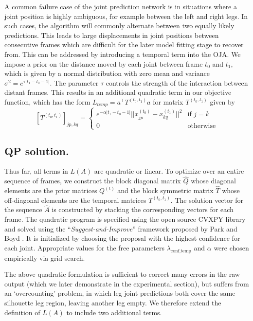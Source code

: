 A common failure case of the joint prediction network is in situations where a joint position is highly ambiguous, for example between the left and right legs. In such cases, the algorithm will commonly alternate between two equally likely predictions. This leads to large displacements in joint positions between consecutive frames which are difficult for the later model fitting stage to recover from. This can be addressed by introducing a temporal term into the OJA. We impose a prior on the distance moved by each joint between frame $t_0$ and $t_1$, which is given by a normal distribution with zero mean and variance $\sigma^{2} =e^{\tau|t_1 - t_0 - 1|}$. 
The parameter $\tau$ controls the strength of the interaction between distant frames. This results in an additional quadratic term in our objective function, which has the form $L_{temp} = a^\top T^{(t_0, t_1)} a$ for matrix $T^{(t_0, t_1)}$ given by 
\begin{equation}
\left[T^{(t_0, t_1)}\right]_{jp, kq} = \begin{cases}
e^{-\alpha|t_1 - t_0 - 1|}||x^{(t_0)}_{jp} - x^{(t_1)}_{kq}||^2 & \text{if } j=k\\
0 & \text{otherwise}
\end{cases}
\end{equation}

\subsection{QP solution.}
Thus far, all terms in $L(A)$ are quadratic or linear.
To optimize over an entire sequence of frames, we construct the block diagonal matrix $\hat{Q}$ whose diagonal elements are the prior matrices $Q^{(t)}$ and the block symmetric matrix $\hat{T}$ whose off-diagonal elements are the temporal matrices $T^{(t_0, t_1)}$. The solution vector for the sequence $\hat{A}$ is constructed by stacking the corresponding vectors for each frame. The quadratic program is specified using the open source CVXPY library \cite{diamond2016cvxpy} and solved using the ``\emph{Suggest-and-Improve}'' framework proposed by Park and Boyd \cite{park2017general}. It is initialized by choosing the proposal with the highest confidence for each joint. Appropriate values for the free parameters $\lambda_{\text{conf}, \text{temp}}$ and $\alpha$ were chosen empirically via grid search. 

The above quadratic formulation is sufficient to correct many errors in the raw output (which we later demonstrate in the experimental section), but suffers from an `overcounting' problem, in which leg joint predictions both cover the same silhouette leg region, leaving another leg empty. We therefore extend the definition of $L(A)$ to include two additional terms. 

